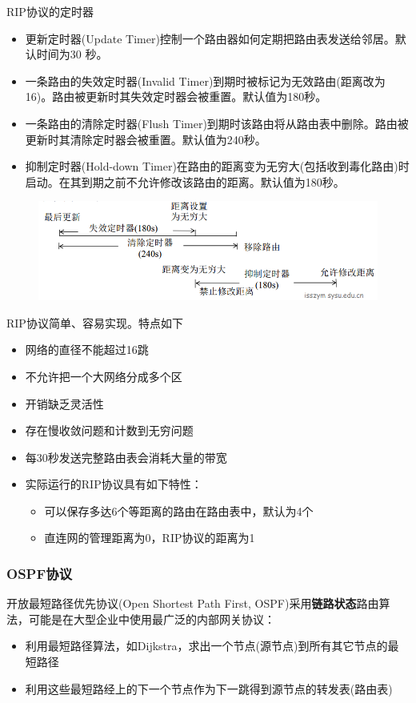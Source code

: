 RIP协议的定时器
\begin{itemize}
\item 更新定时器(Update Timer)控制一个路由器如何定期把路由表发送给邻居。默认时间为30 秒。
\item 一条路由的失效定时器(Invalid Timer)到期时被标记为无效路由(距离改为16)。路由被更新时其失效定时器会被重置。默认值为180秒。
\item 一条路由的清除定时器(Flush Timer)到期时该路由将从路由表中删除。路由被更新时其清除定时器会被重置。默认值为240秒。
\item 抑制定时器(Hold-down Timer)在路由的距离变为无穷大(包括收到毒化路由)时启动。在其到期之前不允许修改该路由的距离。默认值为180秒。
\end{itemize}
\begin{figure}[H]
	\centering
	\includegraphics[width=0.8\linewidth]{fig/rip_timer.png}
\end{figure}

RIP协议简单、容易实现。特点如下
\begin{itemize}
\item 网络的直径不能超过16跳
\item 不允许把一个大网络分成多个区
\item 开销缺乏灵活性
\item 存在慢收敛问题和计数到无穷问题
\item 每30秒发送完整路由表会消耗大量的带宽
\item 实际运行的RIP协议具有如下特性：
\begin{itemize}
\item 可以保存多达6个等距离的路由在路由表中，默认为4个
\item 直连网的管理距离为0，RIP协议的距离为1
\end{itemize}
\end{itemize}

\subsubsection{OSPF协议}
开放最短路径优先协议(Open Shortest Path First, OSPF)采用\textbf{链路状态}路由算法，可能是在大型企业中使用最广泛的内部网关协议：
\begin{itemize}
	\item 利用最短路径算法，如Dijkstra，求出一个节点(源节点)到所有其它节点的最短路径
	\item 利用这些最短路经上的下一个节点作为下一跳得到源节点的转发表(路由表)
\end{itemize}

